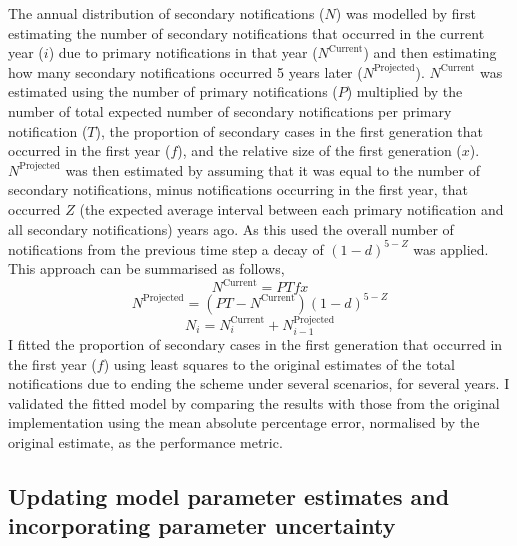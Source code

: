 \documentclass[11pt,twoside]{bristolthesis}
\begin{document}
  The annual distribution of secondary notifications (\(N\)) was modelled by first estimating the number of secondary notifications that occurred in the current year (\(i\)) due to primary notifications in that year (\(N^{\text{Current}}\)) and then estimating how many secondary notifications occurred 5 years later (\(N^{\text{Projected}}\)). \(N^{\text{Current}}\) was estimated using the number of primary notifications (\(P\)) multiplied by the number of total expected number of secondary notifications per primary notification (\(T\)), the proportion of secondary cases in the first generation that occurred in the first year (\(f\)), and the relative size of the first generation (\(x\)). \(N^{\text{Projected}}\) was then estimated by assuming that it was equal to the number of secondary notifications, minus notifications occurring in the first year, that occurred \(Z\) (the expected average interval between each primary notification and all secondary notifications) years ago. As this used the overall number of notifications from the previous time step a decay of \((1 - d)^{5-Z}\) was applied. This approach can be summarised as follows,
  \begin{equation} 
    N^{\text{Current}} = P T  f  x 
  \end{equation}
  \begin{equation} 
    N^{\text{Projected}} = (PT - N^{\text{Current}})(1 - d)^{5-Z}
  \end{equation}
  \begin{equation} 
    N_i = N^{\text{Current}}_i + N^{\text{Projected}}_{i-1}
  \end{equation}
  I fitted the proportion of secondary cases in the first generation that occurred in the first year (\(f\)) using least squares to the original estimates of the total notifications due to ending the scheme under several scenarios, for several years. I validated the fitted model by comparing the results with those from the original implementation using the mean absolute percentage error, normalised by the original estimate, as the performance metric.
  
  \hypertarget{updating-model-parameter-estimates-and-incorporating-parameter-uncertainty}{%
  \subsection{Updating model parameter estimates and incorporating parameter uncertainty}\label{updating-model-parameter-estimates-and-incorporating-parameter-uncertainty}}
  
\end{document}
